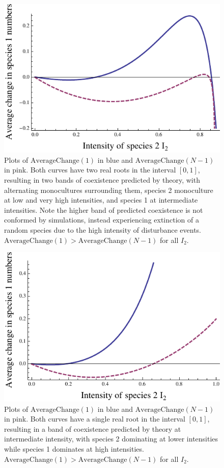 \begin{figure}[htbp]
\includegraphics[width=4.5in]{fourbits}
\caption{Plots of $\text{AverageChange}(1)$ in blue and $\text{AverageChange}(N-1)$ in pink. Both curves have two real roots in the interval $[0,1]$, resulting in two bands of coexistence predicted by theory, with alternating monocultures surrounding them, species 2 monoculture at low and very high intensities, and species 1 at intermediate intensities. Note the higher band of predicted coexistence is not conformed by simulations, instead experiencing extinction of a random species due to the high intensity of disturbance events. $\text{AverageChange}(1)>\text{AverageChange}(N-1)$ for all $I_2$.}
\label{fourbits}
\end{figure}
\begin{figure}[h]
\includegraphics[width=4.5in]{onerooteach}
\caption{Plots of $\text{AverageChange}(1)$ in blue and $\text{AverageChange}(N-1)$ in pink. Both curves have a single real root in the interval $[0,1]$, resulting in a band of coexistence predicted by theory at intermediate intensity, with species 2 dominating at lower intensities while species 1 dominates at high intensities. $\text{AverageChange}(1)>\text{AverageChange}(N-1)$ for all $I_2$.}
\label{onerooteach}
\end{figure}

